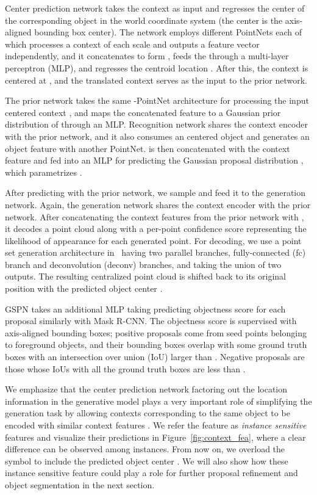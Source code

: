 \documentclass[10pt,twocolumn,letterpaper]{article}
\begin{document}
Center prediction network takes the context  as input and regresses the center  of the corresponding object  in the world coordinate system (the center is the axis-aligned bounding box center).
The network employs  different PointNets each of which processes a context of each scale  and outputs a feature vector  independently, and it concatenates  to form , feeds the  through a multi-layer perceptron (MLP), and regresses the centroid location .
After this, the context  is centered at , and the translated context  serves as the input to the prior network.

The prior network takes the same -PointNet architecture for processing the input centered context , and maps the concatenated feature  to a Gaussian prior distribution  of  through an MLP. Recognition network shares the context encoder with the prior network, and it also consumes an centered object  and generates an object feature  with another PointNet.  is then concatenated with the context feature  and fed into an MLP for predicting the Gaussian proposal distribution , which parametrizes .

After predicting  with the prior network, we sample  and feed it to the generation network. Again, the generation network shares the context encoder with the prior network. After concatenating the context features  from the prior network with , it decodes a point cloud  along with a per-point confidence score  representing the likelihood of appearance for each generated point.
For decoding, we use a point set generation architecture in~\cite{fan2017point} having two parallel branches, fully-connected (fc) branch and deconvolution (deconv) branches, and taking the union of two outputs.
The resulting centralized point cloud is shifted back to its original position with the predicted object center .

GSPN takes an additional MLP taking  predicting objectness score for each proposal similarly with Mask R-CNN.
The objectness score is supervised with axis-aligned bounding boxes; positive proposals come from seed points  belonging to foreground objects, and their bounding boxes overlap with some ground truth boxes with an intersection over union (IoU) larger than . Negative proposals are those whose IoUs with all the ground truth boxes are less than . 

We emphasize that the center prediction network factoring out the location information in the generative model plays a very important role of simplifying the generation task by allowing contexts corresponding to the same object to be encoded with similar context features .
We refer the feature  as \emph{instance sensitive} features and visualize their predictions in Figure~\ref{fig:context_fea}, where a clear difference can be observed among instances. From now on, we overload the symbol  to include the predicted object center . We will also show how these instance sensitive feature could play a role for further proposal refinement and object segmentation in the next section.
\end{document}
